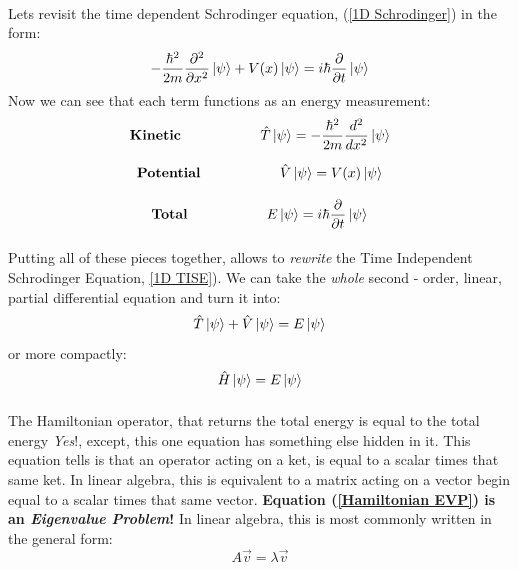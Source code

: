 \documentclass[12pt,letterpaper]{book}
\begin{document}
\paragraph*{}Lets revisit the time dependent Schrodinger equation, (\ref{1D Schrodinger}) in the form:
\begin{equation}
-\frac{\hbar^2}{2m}\frac{\partial^2}{\partial x^2}\ket{\psi} + V(x)\ket{\psi} = i\hbar\frac{\partial}{\partial t}\ket{\psi}
\end{equation}
Now we can see that each term functions as an energy measurement:
\begin{equation}
\text{\textbf{Kinetic}\hspace{2cm}} \hat{T}\ket{\psi} = -\frac{\hbar^2}{2m}\frac{d^2}{dx^2}\ket{\psi}
\end{equation}

\begin{equation}
\text{\textbf{Potential}\hspace{2cm}} \hat{V}\ket{\psi} = V(x)\ket{\psi}
\end{equation}

\begin{equation}
\text{\textbf{Total}\hspace{2cm}}  E\ket{\psi} = i\hbar\frac{\partial}{\partial t}\ket{\psi}
\end{equation} 

\paragraph*{}Putting all of these pieces together, allows to \textit{rewrite} the Time Independent Schrodinger Equation, \ref{1D TISE}). We can take the \textit{whole} second - order, linear, partial differential equation and turn it into:
\begin{equation}
\hat{T}\ket{\psi} + \hat{V}\ket{\psi} = E\ket{\psi}
\end{equation}
or more compactly:
\begin{equation}
\label{Hamiltonian EVP}
\hat{H}\ket{\psi} = E\ket{\psi}
\end{equation}

\paragraph*{}The Hamiltonian operator, that returns the total energy is equal to the total energy \textit{Yes}!, except, this one equation has something else hidden in it. This equation tells is that an operator acting on a ket, is equal to a scalar times that same ket. In linear algebra, this is equivalent to a matrix acting on a vector begin equal to a scalar times that same vector. \textbf{Equation (\ref{Hamiltonian EVP}) is an \textit{Eigenvalue Problem}!} In linear algebra, this is most commonly written in the general form:
\begin{equation}
A\vec{v} = \lambda \vec{v}
\end{equation}
\end{document}

